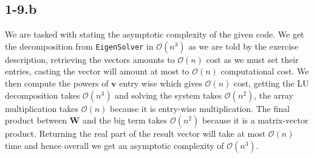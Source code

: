 \documentclass{article}
\begin{document}
\subsection*{1-9.b}
We are tasked with stating the asymptotic complexity of the given code. We get the decomposition from \verb|EigenSolver| in $\mathcal{O}\left(n^{3}\right)$ as we are told by the exercise description, retrieving the vectors amounts to $\mathcal{O}\left(n\right)$ cost as we must set their entries, casting the vector will amount at most to $\mathcal{O}\left(n\right)$ computational cost. We then compute the powers of $\mathbf{v}$ entry wise which gives $\mathcal{O}\left(n\right)$ cost, getting the LU decomposition takes $\mathcal{O}\left(n^{3}\right)$ and solving the system takes $\mathcal{O}\left(n^{2}\right)$, the array multiplication takes $\mathcal{O}\left(n\right)$ because it is entry-wise multiplication. The final product between $\mathbf{W}$ and the big term takes $\mathcal{O}\left(n^{2}\right)$ because it is a matrix-vector product. Returning the real part of the result vector will take at most $\mathcal{O}\left(n\right)$ time and hence overall we get an asymptotic complexity of $\mathcal{O}\left(n^{3}\right)$.
\end{document}
